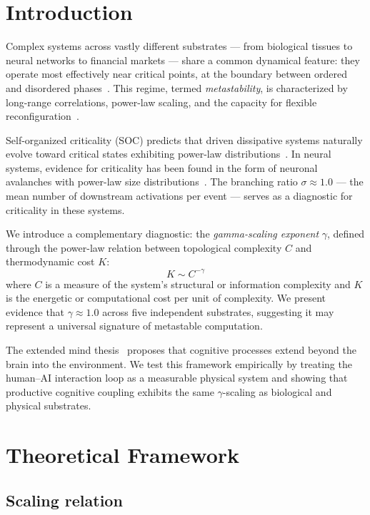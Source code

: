 \documentclass[11pt,a4paper,twocolumn]{article}
\begin{document}
\section{Introduction}

Complex systems across vastly different substrates --- from biological tissues to neural networks to financial markets --- share a common dynamical feature: they operate most effectively near critical points, at the boundary between ordered and disordered phases~\cite{bak1987,beggs2003}. This regime, termed \emph{metastability}, is characterized by long-range correlations, power-law scaling, and the capacity for flexible reconfiguration~\cite{maass2002}.

Self-organized criticality (SOC) predicts that driven dissipative systems naturally evolve toward critical states exhibiting power-law distributions~\cite{bak1987}. In neural systems, evidence for criticality has been found in the form of neuronal avalanches with power-law size distributions~\cite{beggs2003}. The branching ratio $\sigma \approx 1.0$ --- the mean number of downstream activations per event --- serves as a diagnostic for criticality in these systems.

We introduce a complementary diagnostic: the \emph{gamma-scaling exponent} $\gamma$, defined through the power-law relation between topological complexity $C$ and thermodynamic cost $K$:
\begin{equation}
K \sim C^{-\gamma}
\end{equation}
where $C$ is a measure of the system's structural or information complexity and $K$ is the energetic or computational cost per unit of complexity. We present evidence that $\gamma \approx 1.0$ across five independent substrates, suggesting it may represent a universal signature of metastable computation.

The extended mind thesis~\cite{clark1998} proposes that cognitive processes extend beyond the brain into the environment. We test this framework empirically by treating the human--AI interaction loop as a measurable physical system and showing that productive cognitive coupling exhibits the same $\gamma$-scaling as biological and physical substrates.

\section{Theoretical Framework}

\subsection{Scaling relation}
\end{document}
